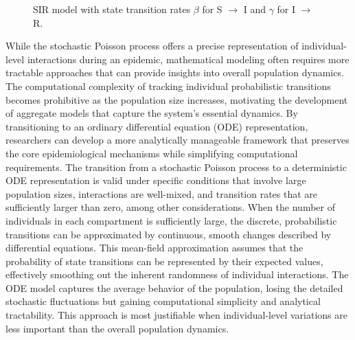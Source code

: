 \begin{figure}[ht]
    \centering
    \caption{SIR model with state transition rates $\beta$ for S $\rightarrow$ I and $\gamma$ for I $\rightarrow$ R.}
    \label{fig:SIR_stochastic_model}
\end{figure}
While the stochastic Poisson process offers a precise representation of individual-level interactions during an epidemic, mathematical modeling often requires more tractable approaches that can provide insights into overall population dynamics. The computational complexity of tracking individual probabilistic transitions becomes prohibitive as the population size increases, motivating the development of aggregate models that capture the system's essential dynamics. By transitioning to an ordinary differential equation (ODE) representation, researchers can develop a more analytically manageable framework that preserves the core epidemiological mechanisms while simplifying computational requirements. The transition from a stochastic Poisson process to a deterministic ODE representation is valid under specific conditions that involve large population sizes, interactions are well-mixed, and transition rates that are sufficiently larger than zero, among other considerations. When the number of individuals in each compartment is sufficiently large, the discrete, probabilistic transitions can be approximated by continuous, smooth changes described by differential equations. This mean-field approximation assumes that the probability of state transitions can be represented by their expected values, effectively smoothing out the inherent randomness of individual interactions. The ODE model captures the average behavior of the population, losing the detailed stochastic fluctuations but gaining computational simplicity and analytical tractability. This approach is most justifiable when individual-level variations are less important than the overall population dynamics.\cite{armbruster2017elementary}
